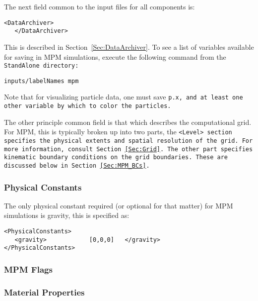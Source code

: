 The next field common to the input files for all components is:

\begin{Verbatim}[fontsize=\footnotesize]
   <DataArchiver>
   </DataArchiver>
\end{Verbatim}
This is described in Section~\ref{Sec:DataArchiver}.  To see a list of
variables available for saving in MPM simulations, execute the following
command from the \tt StandAlone \normalfont directory:

\begin{Verbatim}[fontsize=\footnotesize]
inputs/labelNames mpm
\end{Verbatim}
Note that for visualizing particle data, one must save \tt p.x, \normalfont
and at least one other variable by which to color the particles.

The other principle common field is that which describes the computational
grid.  For MPM, this is typically broken up into two parts, the
\tt <Level> \normalfont section specifies the physical extents and spatial
resolution of the grid.  For more information, consult Section~\ref{Sec:Grid}.
The other part specifies kinematic boundary conditions on the grid boundaries.
These are discussed below in Section~\ref{Sec:MPM_BCs}.

\subsubsection{Physical Constants}
The only physical constant required (or optional for that matter) for
MPM simulations is gravity, this is specified as:

\begin{Verbatim}[fontsize=\footnotesize]
<PhysicalConstants>
   <gravity>            [0,0,0]   </gravity>
</PhysicalConstants>
\end{Verbatim}

\subsubsection{MPM Flags} \label{MPMFlags}

\subsubsection{Material Properties}

